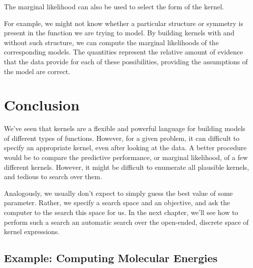 The marginal likelihood can also be used to select the form of the kernel.

For example, we might not know whether a particular structure or symmetry is present in the function we are trying to model.
By building kernels with and without such structure, we can compute the marginal likelihoods of the corresponding \gp{} models.
The quantities represent the relative amount of evidence that the data provide for each of these possibilities, providing the assumptions of the model are correct.



\section{Conclusion}

We've seen that kernels are a flexible and powerful language for building models of different types of functions.
However, for a given problem, it can difficult to specify an appropriate kernel, even after looking at the data.
A better procedure would be to compare the predictive performance, or marginal likelihood, of a few different kernels.
However, it might be difficult to enumerate all plausible kernels, and tedious to search over them.

Analogously, we usually don't expect to simply guess the best value of some parameter.
Rather, we specify a search space and an objective, and ask the computer to the search this space for us. 
In the next chapter, we'll see how to perform such a search an automatic search over the open-ended, discrete space of kernel expressions.


\outbpdocument{


}



\iffalse


\subsection{Example: Computing Molecular Energies}

